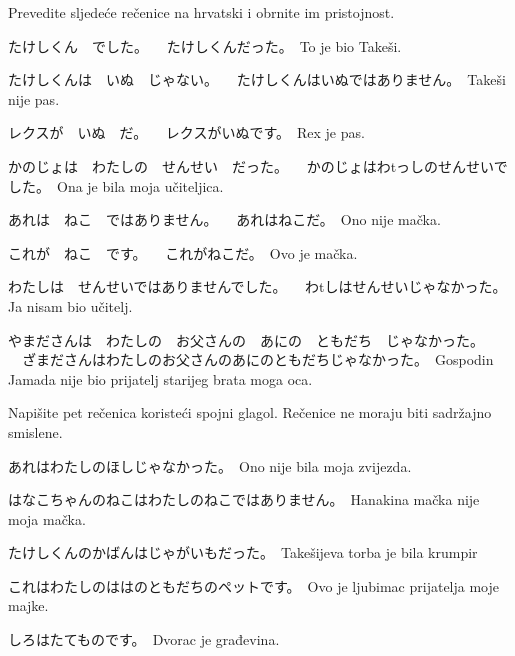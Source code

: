 
\author{Katja Kržišnik}

	
	\begin{mondai}{Prevedite sljedeće rečenice na hrvatski i obrnite im pristojnost.}
		\item たけしくん　でした。 \newline　{たけしくんだった。}　{To je bio Takeši.}
		\item たけしくんは　いぬ　じゃない。 \newline　たけしくんはいぬではありません。　{Takeši nije pas.}
		\item レクスが　いぬ　だ。 \newline　レクスがいぬです。　{Rex je pas.}
		\item かのじょは　わたしの　せんせい　だった。 \newline　かのじょはわtっしのせんせいでした。　{Ona je bila moja učiteljica.}
		\item あれは　ねこ　ではありません。 \newline　あれはねこだ。　{Ono nije mačka.}
		\item これが　ねこ　です。 \newline　これがねこだ。　{Ovo je mačka.}
		\item わたしは　せんせいではありませんでした。 \newline　わtしはせんせいじゃなかった。{Ja nisam bio učitelj.}　
		\item やまださんは　わたしの　お父さんの　あにの　ともだち　じゃなかった。 \newline　ざまださんはわたしのお父さんのあにのともだちじゃなかった。　{Gospodin Jamada nije bio prijatelj starijeg brata moga oca.}
	\end{mondai}
	
		
	\begin{mondai}{Napišite pet rečenica koristeći spojni glagol. Rečenice ne moraju biti sadržajno smislene.}
		\item {あれはわたしのほしじゃなかった。}　{Ono nije bila moja zvijezda.}
		\item {はなこちゃんのねこはわたしのねこではありません。}　{Hanakina mačka nije moja mačka.}
		\item {たけしくんのかばんはじゃがいもだった。}　{Takešijeva torba je bila krumpir}
		\item {これはわたしのははのともだちのペットです。}　{Ovo je ljubimac prijatelja moje majke.}
		\item {しろはたてものです。}　{Dvorac je građevina.}
	\end{mondai}
	
	
